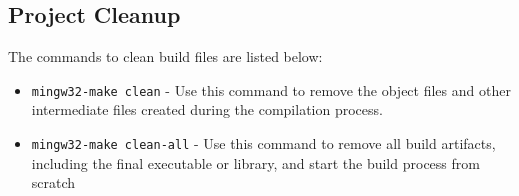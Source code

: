 \documentclass{article}
\begin{document}
\subsection{Project Cleanup}
The commands to clean build files are listed below:
\begin{itemize}
	\item \texttt{mingw32-make clean} - Use this command to remove the object files and other intermediate files created during the compilation process.
	\item \texttt{mingw32-make clean-all} - Use this command to remove all build artifacts, including the final executable or library, and start the build process from scratch
\end{itemize}
\end{document}
